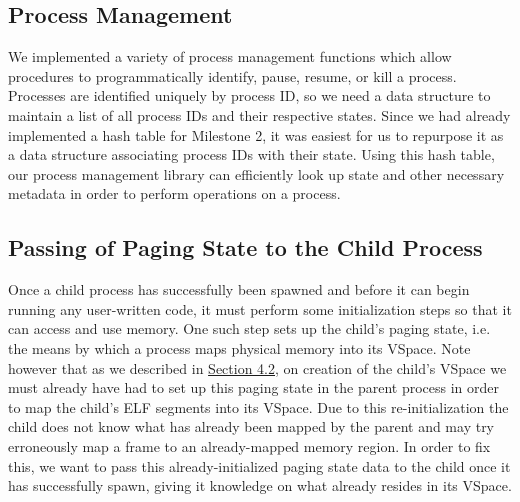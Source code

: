 \subsection{Process Management}
We implemented a variety of process management functions which allow procedures to programmatically identify, pause, resume, or kill a process. Processes are identified uniquely by process ID, so we need a data structure to maintain a list of all process IDs and their respective states. Since we had already implemented a hash table for Milestone 2, it was easiest for us to repurpose it as a data structure associating process IDs with their state. Using this hash table, our process management library can efficiently look up state and other necessary metadata in order to perform operations on a process.

\subsection{Passing of Paging State to the Child Process}
Once a child process has successfully been spawned and before it can begin running any user-written code, it must perform some initialization steps so that it can access and use memory. One such step sets up the child's paging state, i.e. the means by which a process maps physical memory into its VSpace. Note however that as we described in \hyperref[m3-2]{Section 4.2}, on creation of the child's VSpace we must already have had to set up this paging state in the parent process in order to map the child's ELF segments into its VSpace. Due to this re-initialization the child does not know what has already been mapped by the parent and may try erroneously map a frame to an already-mapped memory region. In order to fix this, we want to pass this already-initialized paging state data to the child once it has successfully spawn, giving it knowledge on what already resides in its VSpace.

